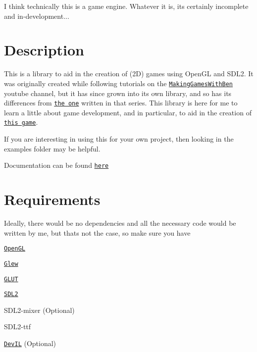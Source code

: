 \href{https://travis-ci.org/NivenT/jubilant-funicular}{\tt }

I think technically this is a game engine. Whatever it is, it\textquotesingle{}s certainly incomplete and in-\/development...

\section*{Description}

This is a library to aid in the creation of (2D) games using Open\+GL and S\+D\+L2. It was originally created while following tutorials on the \href{https://www.youtube.com/channel/UCL5m1_llmeiAdZMo_ZanIvg}{\tt Making\+Games\+With\+Ben} youtube channel, but it has since grown into its own library, and so has its differences from \href{https://github.com/Barnold1953/GraphicsTutorials}{\tt the one} written in that series. This library is here for me to learn a little about game development, and in particular, to aid in the creation of \href{https://github.com/NivenT/Planet}{\tt this game}.

If you are interesting in using this for your own project, then looking in the {\ttfamily examples} folder may be helpful.

Documentation can be found \href{https://nivent.github.io/jubilant-funicular/html/index.html}{\tt here}

\section*{Requirements}

Ideally, there would be no dependencies and all the necessary code would be written by me, but that\textquotesingle{}s not the case, so make sure you have


\begin{DoxyItemize}
\item \href{https://www.opengl.org/}{\tt Open\+GL}
\begin{DoxyItemize}
\item \href{http://glew.sourceforge.net/}{\tt Glew}
\item \href{http://freeglut.sourceforge.net/}{\tt G\+L\+UT}
\end{DoxyItemize}
\item \href{https://www.libsdl.org/download-2.0.php}{\tt S\+D\+L2}
\begin{DoxyItemize}
\item S\+D\+L2-\/mixer (Optional)
\item S\+D\+L2-\/ttf
\end{DoxyItemize}
\item \href{http://openil.sourceforge.net/}{\tt Dev\+IL} (Optional)
\end{DoxyItemize}

